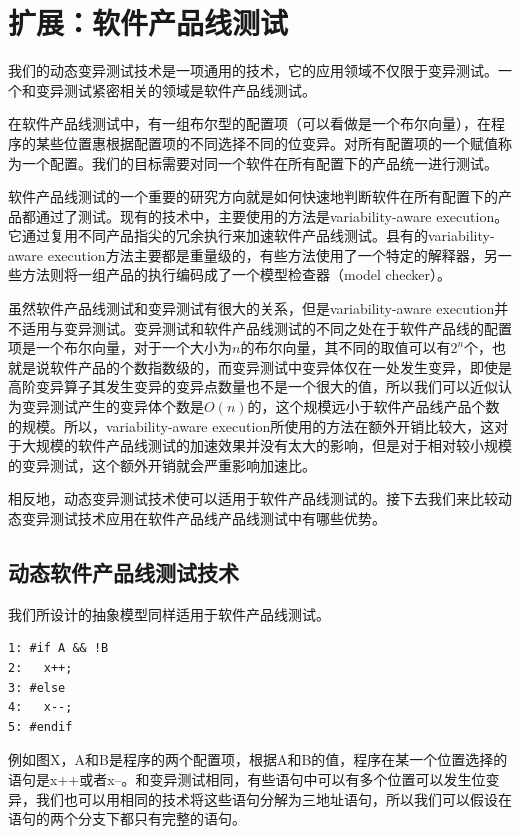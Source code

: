 \documentclass[nofonts]{ctexrep}
\begin{document}
\chapter{扩展：软件产品线测试}
我们的动态变异测试技术是一项通用的技术，它的应用领域不仅限于变异测试。一个和变异测试紧密相关的领域是软件产品线测试。

在软件产品线测试中，有一组布尔型的配置项（可以看做是一个布尔向量），在程序的某些位置惠根据配置项的不同选择不同的位变异。对所有配置项的一个赋值称为一个配置。我们的目标需要对同一个软件在所有配置下的产品统一进行测试。

软件产品线测试的一个重要的研究方向就是如何快速地判断软件在所有配置下的产品都通过了测试。现有的技术中，主要使用的方法是variability-aware execution。它通过复用不同产品指尖的冗余执行来加速软件产品线测试。县有的variability-aware execution方法主要都是重量级的，有些方法使用了一个特定的解释器，另一些方法则将一组产品的执行编码成了一个模型检查器（model checker）。

虽然软件产品线测试和变异测试有很大的关系，但是variability-aware execution并不适用与变异测试。变异测试和软件产品线测试的不同之处在于软件产品线的配置项是一个布尔向量，对于一个大小为$n$的布尔向量，其不同的取值可以有$2^n$个，也就是说软件产品的个数指数级的，而变异测试中变异体仅在一处发生变异，即使是高阶变异算子其发生变异的变异点数量也不是一个很大的值，所以我们可以近似认为变异测试产生的变异体个数是$O(n)$的，这个规模远小于软件产品线产品个数的规模。所以，variability-aware execution所使用的方法在额外开销比较大，这对于大规模的软件产品线测试的加速效果并没有太大的影响，但是对于相对较小规模的变异测试，这个额外开销就会严重影响加速比。

相反地，动态变异测试技术使可以适用于软件产品线测试的。接下去我们来比较动态变异测试技术应用在软件产品线产品线测试中有哪些优势。

\section{动态软件产品线测试技术}
我们所设计的抽象模型同样适用于软件产品线测试。

\begin{verbatim}
1: #if A && !B
2:   x++;
3: #else
4:   x--;
5: #endif
\end{verbatim}

例如图X，A和B是程序的两个配置项，根据A和B的值，程序在某一个位置选择的语句是x++或者x--。和变异测试相同，有些语句中可以有多个位置可以发生位变异，我们也可以用相同的技术将这些语句分解为三地址语句，所以我们可以假设在语句的两个分支下都只有完整的语句。
\end{document}
